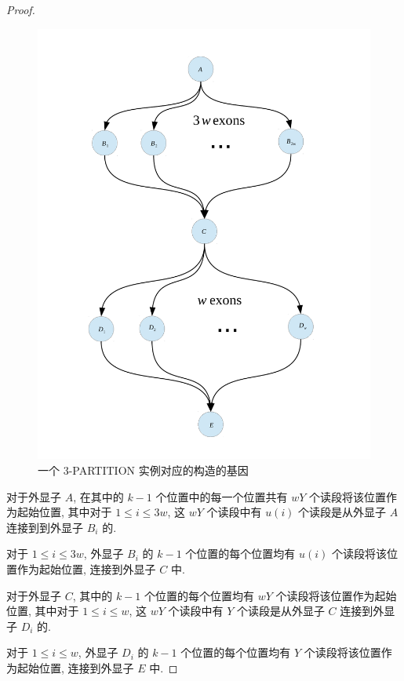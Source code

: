 \begin{proof}
\begin{figure}[!t]
\centering
\includegraphics[width=1.0\textwidth]{figures/nphard/part3-gene.pdf}
\caption{一个 3-PARTITION 实例对应的构造的基因}
\label{tripart-reduce-gene}
\end{figure}

对于外显子 $A$, 在其中的 $k-1$ 个位置中的每一个位置共有 $wY$ 个读段将该位置作为起始位置, 
其中对于 $1\leq i\leq 3w$, 
这 $wY$ 个读段中有 $u(i)$ 个读段是从外显子 $A$ 连接到到外显子 $B_i$ 的. 

对于 $1\leq i\leq 3w$, 
外显子 $B_i$ 的 $k-1$ 个位置的每个位置均有 $u(i)$ 个读段将该位置作为起始位置, 
连接到外显子 $C$ 中. 

对于外显子 $C$, 其中的 $k-1$ 个位置的每个位置均有 $wY$ 个读段将该位置作为起始位置, 
其中对于 $1\leq i \leq w$,
这 $wY$ 个读段中有 $Y$ 个读段是从外显子 $C$ 连接到外显子 $D_i$ 的. 

对于 $1\leq i \leq w$,
外显子 $D_i$ 的 $k-1$ 个位置的每个位置均有 $Y$ 个读段将该位置作为起始位置, 
连接到外显子 $E$ 中. 


\end{proof}
